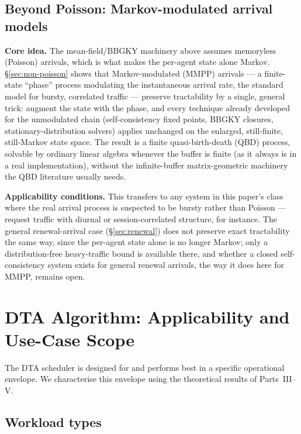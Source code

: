 \documentclass[11pt,a4paper]{report}
\begin{document}
\subsection{Beyond Poisson: Markov-modulated arrival models}

\medskip
\noindent\textbf{Core idea.}
The mean-field/BBGKY machinery above assumes memoryless (Poisson)
arrivals, which is what makes the per-agent state alone Markov.
\S\ref{sec:non-poisson} shows that Markov-modulated (MMPP) arrivals
--- a finite-state ``phase'' process modulating the instantaneous
arrival rate, the standard model for bursty, correlated traffic ---
preserve tractability by a single, general trick: augment the state
with the phase, and every technique already developed for the
unmodulated chain (self-consistency fixed points, BBGKY closures,
stationary-distribution solvers) applies unchanged on the enlarged,
still-finite, still-Markov state space. The result is a finite
quasi-birth-death (QBD) process, solvable by ordinary linear algebra
whenever the buffer is finite (as it always is in a real
implementation), without the infinite-buffer matrix-geometric
machinery the QBD literature usually needs.

\medskip
\noindent\textbf{Applicability conditions.}
This transfers to any system in this paper's class where the real
arrival process is suspected to be bursty rather than Poisson ---
request traffic with diurnal or session-correlated structure, for
instance. The general renewal-arrival case (\S\ref{sec:renewal}) does
not preserve exact tractability the same way, since the per-agent
state alone is no longer Markov; only a distribution-free
heavy-traffic bound is available there, and whether a closed
self-consistency system exists for general renewal arrivals, the way
it does here for MMPP, remains open.

\section{DTA Algorithm: Applicability and Use-Case Scope}
\label{sec:dta_scope}

The DTA scheduler is designed for and performs best in a specific
operational envelope.  We characterise this envelope using the
theoretical results of Parts~III--V.

\subsection{Workload types}
\end{document}
